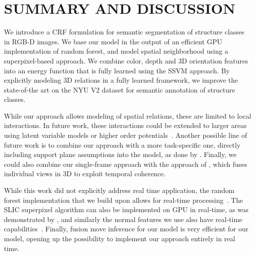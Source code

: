 \documentclass[a4paper, 10pt, conference]{ieeeconf}      %
\begin{document}
\section{SUMMARY AND DISCUSSION}
We introduce a CRF formulation for semantic segmentation
of structure classes in RGB-D images. We base our model in the output of an efficient GPU implementation
of random forest, and model spatial neighborhood using a superpixel-based approach.
We combine color, depth and 3D orientation features into an energy function that is fully learned using 
 the SSVM approach. By explicitly modeling 3D
 relations in a fully learned framework, we improve the state-of-the art on the
 NYU V2 dataset for semantic annotation of structure classes.


While our approach allows modeling of spatial relations, these are limited to
local interactions. In future work, these interactions could be extended to
larger areas using latent variable models or higher
order potentials~\citep{ladicky2009associative}.
Another possible line of future work is to combine our approach with a more
task-specific one, directly including support plane assumptions into the model,
as done by \citet{SilbermanECCV12}. Finally, we could also combine our
single-frame approach with the approach of \citet{stueckler2013}, which fuses
individual views in 3D to exploit temporal coherence.

While this work did not explicitly address real time application, the random
forest implementation that we build upon allows for real-time
processing~\citep{stueckler2013}. The SLIC superpixel algorithm can also be
implemented on GPU in real-time, as was demonstrated by \citep{ren2011gslic}, and similarly
the normal features we use also have
real-time capabilities~\citep{holz_2011_robocup}.
Finally, fusion move inference for our model is very efficient for our model,
opening up the possibility to implement our approach entirely in real time.
\printbibliography{}
\end{document}
